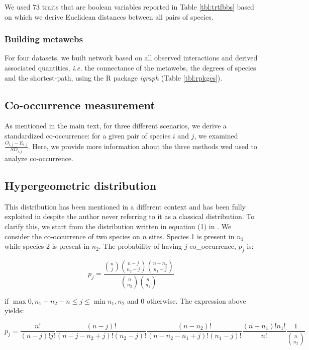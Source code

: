 We used 73 traits that are boolean variables reported in Table
\ref{tbl:trtfbbs} based on which we derive Euclidean distances between
all pairs of species.

\subsubsection{Building metawebs}\label{building-metawebs}

For four datasets, we built network based on all observed interactions
and derived associated quantities, \emph{i.e.} the connectance of the
metawebs, the degrees of species and the shortest-path, using the R
package \emph{igraph} (Table \ref{tbl:rpkges}).

\subsection{Co-occurrence measurement}\label{co-occurrence-measurement}

As mentioned in the main text, for three different scenarios, we derive
a standardized co-occurrence: for a given pair of species \(i\) and
\(j\), we examined \(\frac{O_{i,j}-E_{i,j}}{SD_{i,j}}\). Here, we
provide more information about the three methods wed used to analyze
co-occurrence.

\subsection{Hypergeometric
distribution}\label{hypergeometric-distribution}

This distribution has been mentioned in a different context
\citep[see][]{Gilpin1982} and has been fully exploited in
\citet{Veech2013} despite the author never referring to it as a
classical distribution. To clarify this, we start from the distribution
written in equation (1) in \citet{Veech2013}. We consider the
co-occurrence of two species on \(n\) sites. Species 1 is present in
\(n_1\) while species 2 is present in \(n_2\). The probability of having
\(j\) co\_occurrence, \(p_j\) is:

\[ p_j= \frac{\binom{n}{j} \binom{n-j}{n_2-j} \binom{n-n_2}{n_1-j}}{\binom{n}{n_2} \binom{n}{n_2}} \]

if \(\max{0, n_1+n_2-n} \leq j \leq \min{n_1, n_2}\) and 0 otherwise.
The expression above yields:

\[ p_j= \frac{n!}{(n-j)!j!} \frac{(n-j)!}{(n-j-n_2+j)!(n_2-j)!} \frac{(n-n_2)!}{(n-n_2-n_1+j)!(n_1-j)!} \frac{(n-n_1)!n_1!}{n!} \frac{1}{\binom{n}{n_2}} \]

